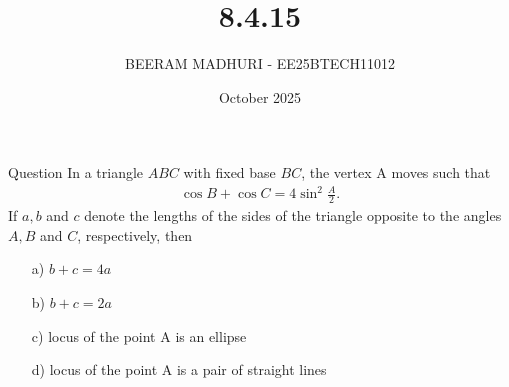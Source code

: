 \documentclass{beamer}
\title %
{8.4.15}
\date{October  2025}
\author %
{BEERAM MADHURI - EE25BTECH11012}
\begin{document}
\frame{\titlepage}
\begin{frame}{Question}
In a triangle $ABC$ with fixed base $BC$, the vertex A moves such that
\begin{align*}
\cos B + \cos C = 4 \sin^2 \frac{A}{2}.
\end{align*}
If $a, b$ and $c$ denote the lengths of the sides of the triangle opposite to the angles $A, B$ and $C$, respectively, then

\begin{enumerate}
    \item[a)] $b + c = 4a$
    \item[b)] $b + c = 2a$
    \item[c)] locus of the point A is an ellipse
    \item[d)] locus of the point A is a pair of straight lines
\end{enumerate}
\end{frame}
\end{document}

